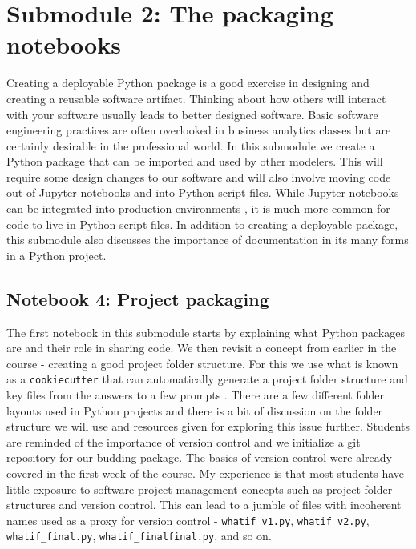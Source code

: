 \documentclass[ited,blindrev]{informs3}              %
\newcommand{\code}[1]{\texttt{#1}}
\begin{document}
\section{Submodule 2: The packaging notebooks}

Creating a deployable Python package is a good exercise in designing and creating a reusable software artifact. Thinking about how others will interact with your software usually leads to better designed software. Basic software engineering practices are often overlooked in business analytics classes but are certainly desirable in the professional world. In this submodule we create a Python package that can be imported and used by other modelers. This will require some design changes to our software and will also involve moving code out of Jupyter notebooks and into Python script files. While Jupyter notebooks can be integrated into production environments \cite{netflix}, it is much more common for code to live in Python script files. In addition to creating a deployable package, this submodule also discusses the importance of documentation in its many forms in a Python project.

\subsection{Notebook 4: Project packaging}

The first notebook in this submodule starts by explaining what Python packages are and their role in sharing code. We then revisit a concept from earlier in the course - creating a good project folder structure. For this we use what is known as a \code{cookiecutter} that can automatically generate a project folder structure and key files from the answers to a few prompts \cite{cookiecutter}. There are a few different folder layouts used in Python projects and there is a bit of discussion on the folder structure we will use and resources given for exploring this issue further. Students are reminded of the importance of version control and we initialize a git repository for our budding package. The basics of version control were already covered in the first week of the course. My experience is that most students have little exposure to software project management concepts such as project folder structures and version control. This can lead to a jumble of files with incoherent names used as a proxy for version control - \code{whatif\_v1.py}, \code{whatif\_v2.py}, \code{whatif\_final.py}, \code{whatif\_finalfinal.py}, and so on.
\end{document}
